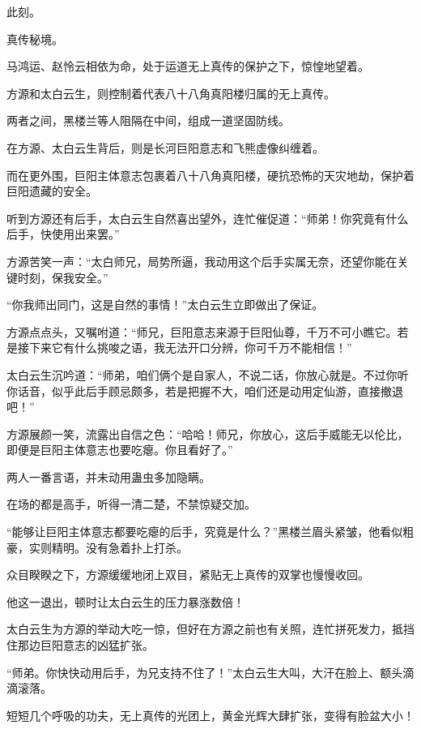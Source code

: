 
\begin{this_body}

此刻。

真传秘境。

马鸿运、赵怜云相依为命，处于运道无上真传的保护之下，惊惶地望着。

方源和太白云生，则控制着代表八十八角真阳楼归属的无上真传。

两者之间，黑楼兰等人阻隔在中间，组成一道坚固防线。

在方源、太白云生背后，则是长河巨阳意志和飞熊虚像纠缠着。

而在更外围，巨阳主体意志包裹着八十八角真阳楼，硬抗恐怖的天灾地劫，保护着巨阳遗藏的安全。

听到方源还有后手，太白云生自然喜出望外，连忙催促道：“师弟！你究竟有什么后手，快使用出来罢。”

方源苦笑一声：“太白师兄，局势所逼，我动用这个后手实属无奈，还望你能在关键时刻，保我安全。”

“你我师出同门，这是自然的事情！”太白云生立即做出了保证。

方源点点头，又嘱咐道：“师兄，巨阳意志来源于巨阳仙尊，千万不可小瞧它。若是接下来它有什么挑唆之语，我无法开口分辨，你可千万不能相信！”

太白云生沉吟道：“师弟，咱们俩个是自家人，不说二话，你放心就是。不过你听你话音，似乎此后手顾忌颇多，若是把握不大，咱们还是动用定仙游，直接撤退吧！”

方源展颜一笑，流露出自信之色：“哈哈！师兄，你放心，这后手威能无以伦比，即便是巨阳主体意志也要吃瘪。你且看好了。”

两人一番言语，并未动用蛊虫多加隐瞒。

在场的都是高手，听得一清二楚，不禁惊疑交加。

“能够让巨阳主体意志都要吃瘪的后手，究竟是什么？”黑楼兰眉头紧皱，他看似粗豪，实则精明。没有急着扑上打杀。

众目睽睽之下，方源缓缓地闭上双目，紧贴无上真传的双掌也慢慢收回。

他这一退出，顿时让太白云生的压力暴涨数倍！

太白云生为方源的举动大吃一惊，但好在方源之前也有关照，连忙拼死发力，抵挡住那边巨阳意志的凶猛扩张。

“师弟。你快快动用后手，为兄支持不住了！”太白云生大叫，大汗在脸上、额头滴滴滚落。

短短几个呼吸的功夫，无上真传的光团上，黄金光辉大肆扩张，变得有脸盆大小！


\end{this_body}
